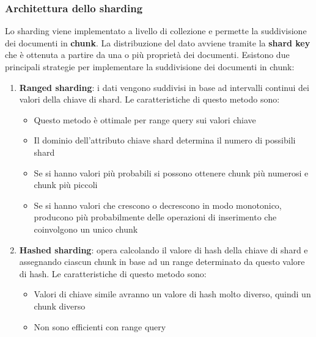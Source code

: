\documentclass[a4paper]{article}
\begin{document}
\subsubsection{Architettura dello sharding}
Lo sharding viene implementato a livello di collezione e permette la suddivisione
dei documenti in \textbf{chunk}. La distribuzione del dato avviene tramite la
\textbf{shard key} che è ottenuta a partire da una o più proprietà dei documenti.
Esistono due principali strategie per implementare la suddivisione dei documenti
in chunk:
\begin{enumerate}
  \item \textbf{Ranged sharding}: i dati vengono suddivisi in base ad intervalli
    continui dei valori della chiave di shard. Le caratteristiche di questo metodo sono:
    \begin{itemize}
      \item Questo metodo è ottimale per range query sui valori chiave

      \item Il dominio dell'attributo chiave shard
        determina il numero di possibili shard

      \item Se si hanno valori più probabili si possono ottenere chunk più numerosi
        e chunk più piccoli

      \item Se si hanno valori che crescono o decrescono in modo monotonico, producono
        più probabilmente delle operazioni di inserimento che coinvolgono un unico
        chunk
    \end{itemize}

  \item \textbf{Hashed sharding}: opera calcolando il valore di hash della chiave
    di shard e assegnando ciascun chunk in base ad un range determinato da questo
    valore di hash. Le caratteristiche di questo metodo sono:
    \begin{itemize}
      \item Valori di chiave simile avranno un valore di hash molto diverso, quindi
        un chunk diverso

      \item Non sono efficienti con range query
    \end{itemize}
\end{enumerate}
\end{document}
